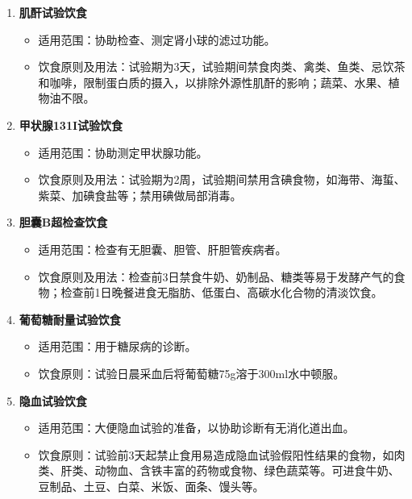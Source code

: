 \documentclass[11pt, a4paper]{ctexart}
\begin{document}
\begin{enumerate}
	\item \textbf{肌酐试验饮食}
	      \begin{itemize}
		      \item 适用范围：协助检查、测定肾小球的滤过功能。
		      \item 饮食原则及用法：试验期为3天，试验期间禁食肉类、禽类、鱼类、忌饮茶和咖啡，限制蛋白质的摄入，以排除外源性肌酐的影响；蔬菜、水果、植物油不限。
	      \end{itemize}
	\item \textbf{甲状腺131I试验饮食}
	      \begin{itemize}
		      \item 适用范围：协助测定甲状腺功能。
		      \item 饮食原则及用法：试验期为2周，试验期间禁用含碘食物，如海带、海蜇、紫菜、加碘食盐等；禁用碘做局部消毒。
	      \end{itemize}
	\item \textbf{胆囊B超检查饮食}
	      \begin{itemize}
		      \item 适用范围：检查有无胆囊、胆管、肝胆管疾病者。
		      \item 饮食原则及用法：检查前3日禁食牛奶、奶制品、糖类等易于发酵产气的食物；检查前1日晚餐进食无脂肪、低蛋白、高碳水化合物的清淡饮食。
	      \end{itemize}
	\item \textbf{葡萄糖耐量试验饮食}
	      \begin{itemize}
		      \item 适用范围：用于糖尿病的诊断。
		      \item 饮食原则：试验日晨采血后将葡萄糖75g溶于300ml水中顿服。
	      \end{itemize}
	\item \textbf{隐血试验饮食}
	      \begin{itemize}
		      \item 适用范围：大便隐血试验的准备，以协助诊断有无消化道出血。
		      \item 饮食原则：试验前3天起禁止食用易造成隐血试验假阳性结果的食物，如肉类、肝类、动物血、含铁丰富的药物或食物、绿色蔬菜等。可进食牛奶、豆制品、土豆、白菜、米饭、面条、馒头等。
	      \end{itemize}
\end{enumerate}
\end{document}
